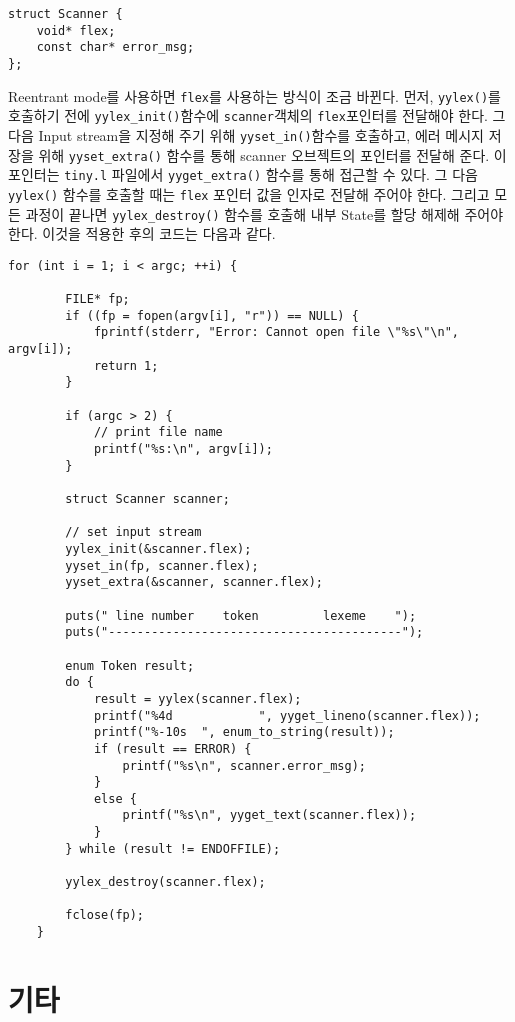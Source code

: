 \documentclass[a4paper, 10pt]{oblivoir}
\begin{document}
\begin{lstlisting}
struct Scanner {
    void* flex;
    const char* error_msg;
};
\end{lstlisting}

Reentrant mode를 사용하면 \texttt{flex}를 사용하는 방식이 조금 바뀐다. 먼저, \texttt{yylex()}를 호출하기 전에 \texttt{yylex\_init()}함수에 \texttt{scanner}객체의 \texttt{flex}포인터를 전달해야 한다. 그 다음 Input stream을 지정해 주기 위해 \texttt{yyset\_in()}함수를 호출하고, 에러 메시지 저장을 위해 \texttt{yyset\_extra()} 함수를 통해 scanner 오브젝트의 포인터를 전달해 준다. 이 포인터는 \texttt{tiny.l} 파일에서 \texttt{yyget\_extra()} 함수를 통해 접근할 수 있다. 그 다음 \texttt{yylex()} 함수를 호출할 때는 \texttt{flex} 포인터 값을 인자로 전달해 주어야 한다. 그리고 모든 과정이 끝나면 \texttt{yylex\_destroy()} 함수를 호출해 내부 State를 할당 해제해 주어야 한다. 이것을 적용한 후의 코드는 다음과 같다.

\begin{lstlisting}[caption=Segment of main.c, frame=single]
    for (int i = 1; i < argc; ++i) {

        FILE* fp;
        if ((fp = fopen(argv[i], "r")) == NULL) {
            fprintf(stderr, "Error: Cannot open file \"%s\"\n", argv[i]);
            return 1;
        }

        if (argc > 2) {
            // print file name
            printf("%s:\n", argv[i]);
        }

        struct Scanner scanner;

        // set input stream
        yylex_init(&scanner.flex);
        yyset_in(fp, scanner.flex);
        yyset_extra(&scanner, scanner.flex);

        puts(" line number    token         lexeme    ");
        puts("-----------------------------------------");

        enum Token result;
        do {
            result = yylex(scanner.flex);
            printf("%4d            ", yyget_lineno(scanner.flex));
            printf("%-10s  ", enum_to_string(result));
            if (result == ERROR) {
                printf("%s\n", scanner.error_msg);
            }
            else {
                printf("%s\n", yyget_text(scanner.flex));
            }
        } while (result != ENDOFFILE);

        yylex_destroy(scanner.flex);

        fclose(fp);
    }
\end{lstlisting}

\section{기타}
\end{document}
